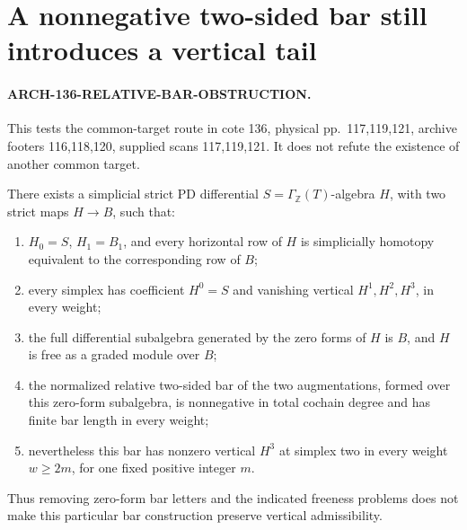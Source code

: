 \section{A nonnegative two-sided bar still introduces a vertical tail}

\paragraph{ARCH-136-RELATIVE-BAR-OBSTRUCTION.}
This tests the common-target route in cote 136, physical pp.~117,119,121,
archive footers 116,118,120, supplied scans 117,119,121.
It does not refute the existence of another common target.

There exists a simplicial strict PD differential \(S=\Gamma_{\mathbb Z}(T)\)-algebra
\(H\), with two strict maps \(H\to B\), such that:
\begin{enumerate}
\item \(H_0=S\), \(H_1=B_1\), and every horizontal row of \(H\) is
simplicially homotopy equivalent to the corresponding row of \(B\);
\item every simplex has coefficient \(H^0=S\) and vanishing vertical
\(H^1,H^2,H^3\), in every weight;
\item the full differential subalgebra generated by the zero forms of
\(H\) is \(B\), and \(H\) is free as a graded module over \(B\);
\item the normalized relative two-sided bar of the two augmentations,
formed over this zero-form subalgebra, is nonnegative in total cochain
degree and has finite bar length in every weight;
\item nevertheless this bar has nonzero vertical \(H^3\) at simplex two
in every weight \(w\geq2m\), for one fixed positive integer \(m\).
\end{enumerate}
Thus removing zero-form bar letters and the indicated freeness problems
does not make this particular bar construction preserve vertical admissibility.

